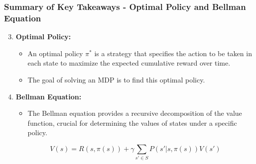 \documentclass[aspectratio=169]{beamer}
\begin{document}
\begin{frame}[fragile]
    \frametitle{Summary of Key Takeaways - Optimal Policy and Bellman Equation}
    \begin{enumerate}
        \setcounter{enumi}{2}
        \item \textbf{Optimal Policy:}
        \begin{itemize}
            \item An optimal policy \( \pi^* \) is a strategy that specifies the action to be taken in each state to maximize the expected cumulative reward over time.
            \item The goal of solving an MDP is to find this optimal policy.
        \end{itemize}
        
        \item \textbf{Bellman Equation:}
        \begin{itemize}
            \item The Bellman equation provides a recursive decomposition of the value function, crucial for determining the values of states under a specific policy.
        \end{itemize}
        \begin{equation}
            V(s) = R(s, \pi(s)) + \gamma \sum_{s' \in S} P(s'|s, \pi(s)) V(s')
        \end{equation}
    \end{enumerate}
\end{frame}
\end{document}
